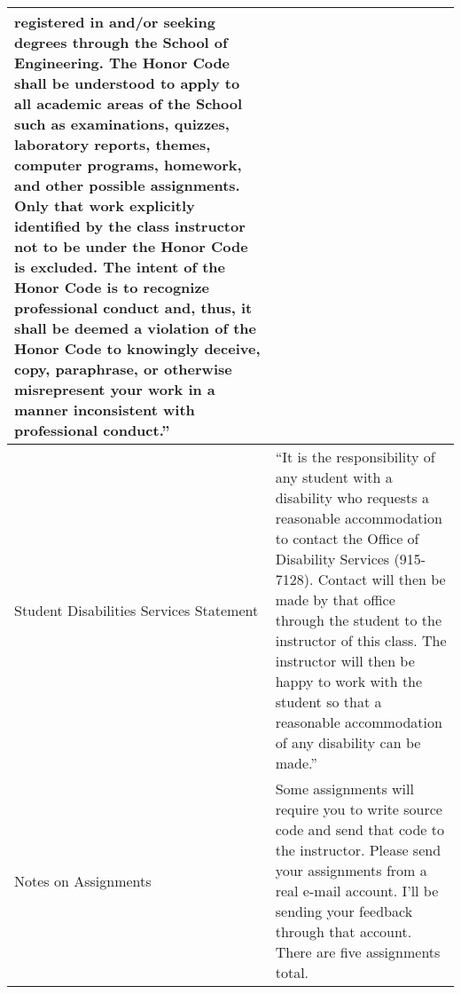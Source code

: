 \documentclass[letterpaper,10pt]{article}
\begin{document}
\begin{tabular}{|p{2in}|p{4in}|}
registered in and/or seeking degrees through the School of Engineering. The
Honor Code shall be understood to apply to all academic areas of the School
such as examinations, quizzes, laboratory reports, themes, computer programs,
homework, and other possible assignments. Only that work explicitly identified by
the class instructor not to be under the Honor Code is excluded. The intent of the
Honor Code is to recognize professional conduct and, thus, it shall be deemed a
violation of the Honor Code to knowingly deceive, copy, paraphrase, or otherwise
misrepresent your work in a manner inconsistent with professional conduct.''\\ \hline
Student Disabilities Services Statement& ``It is the responsibility of any student with a disability who requests a reasonable accommodation to contact the Office of Disability Services (915-7128). Contact will then be made by that office through the student to the instructor of this class. The instructor will then be happy to work with the student so that a reasonable accommodation of any disability can be made.''\\ \hline
Notes on Assignments&Some assignments will require you to write source code and send that code to the instructor. Please send your assignments from a real e-mail account. I'll be sending your feedback through that account. There are five assignments total.\\ \hline
\end{tabular}
\end{document}
